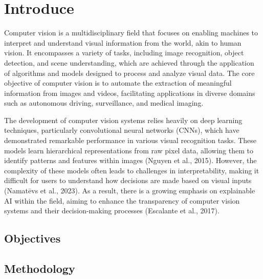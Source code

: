 \documentclass{article}
\begin{document}
\title{}
\author{Marcin Ryzewski}
\date{\today}
\maketitle  

\section{Introduce}

Computer vision is a multidisciplinary field that focuses 
on enabling machines to interpret and understand visual 
information from the world, akin to human vision. 
It encompasses a variety of tasks, including image 
recognition, object detection, and scene understanding, 
which are achieved through the application of algorithms and 
models designed to process and analyze visual data. 
The core objective of computer vision is to automate the 
extraction of meaningful information from images and videos, 
facilitating applications in diverse domains such as 
autonomous driving, surveillance, and medical imaging.

The development of computer vision systems relies heavily 
on deep learning techniques, particularly convolutional 
neural networks (CNNs), which have demonstrated remarkable 
performance in various visual recognition tasks. These 
models learn hierarchical representations from raw pixel 
data, allowing them to identify patterns and features 
within images (Nguyen et al., 2015). However, the complexity 
of these models often leads to challenges in interpretability, 
making it difficult for users to understand how decisions 
are made based on visual inputs (Namatēvs et al., 2023). 
As a result, there is a growing emphasis on explainable 
AI within the field, aiming to enhance the transparency 
of computer vision systems and their decision-making 
processes (Escalante et al., 2017).

\subsection{Objectives}

\subsection{Methodology}
\end{document}
